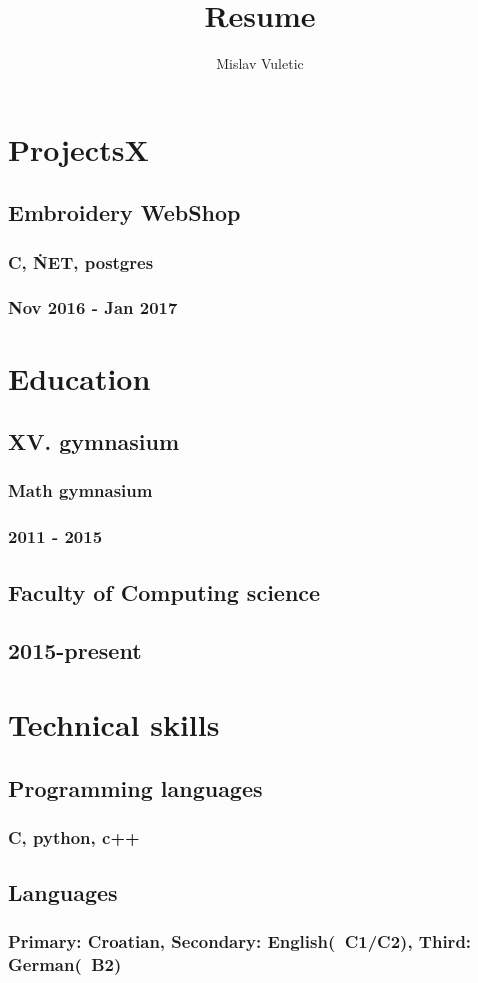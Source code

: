 \documentclass{article}
\begin{document}
\title{Resume}
\author{Mislav Vuletic}

\maketitle

\section{ProjectsX}

\subsection{Embroidery WebShop}
\subsubsection{C, \.NET, postgres}
\subsubsection{Nov 2016 - Jan 2017}

\section{Education}

\subsection{XV. gymnasium}
\subsubsection{Math gymnasium}
\subsubsection{2011 - 2015}

\subsection{Faculty of Computing science}
\subsection{2015-present}

\section{Technical skills}

\subsection{Programming languages}
\subsubsection{C, python, c++}
\subsection{Languages}
\subsubsection{Primary: Croatian, Secondary: English(~C1/C2), Third: German(~B2)}
\end{document}
